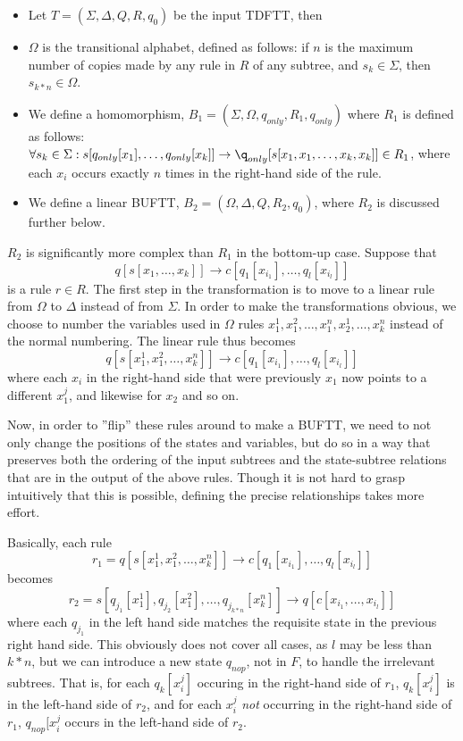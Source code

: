 \begin{itemize}
\item Let $T = (\Sigma, \Delta, Q, R, q_0)$ be the input TDFTT, then

\item $\Omega$ is the transitional alphabet, defined as follows: if $n$ is
the maximum number of copies made by any rule in $R$ of any subtree, and 
$s_k \in \Sigma$, then $s_{k*n} \in \Omega$.

\item We define a homomorphism, $B_1 = (\Sigma, \Omega, q_{only}, R_1, q_{only})$
where $R_1$ is defined as follows: $\forall s_k \in \Sigma:
s[q_{only}[x_1],\ldots,q_{only}[x_k]] \rightarrow
\q_{only}[s[x_1,x_1,\ldots,x_k,x_k]] \in R_1$, where each $x_i$ occurs
exactly $n$ times in the right-hand side of the rule.

\item We define a linear BUFTT, $B_2 = (\Omega, \Delta, Q, R_2, q_0)$,
	where $R_2$ is discussed further below.
\end{itemize}

$R_2$ is significantly more complex than $R_1$ in the bottom-up case. Suppose
that $$q[s[x_1,\ldots,x_k]] \rightarrow c[q_1[x_i_1],\ldots,q_l[x_i_l]]$$
is a rule $r \in R$. The first step in the transformation is to move to a
linear rule from $\Omega$ to $\Delta$ instead of from $\Sigma$.  In order
to make the transformations obvious, we choose to number the variables used
in $\Omega$ rules $x_1^1,x_1^2,\ldots,x_1^n,x_2^1,\ldots,x_k^n$ instead of
the normal numbering. The linear rule thus becomes
$$q[s[x_1^1,x_1^2,\ldots,x_k^n]] \rightarrow c[q_1[x_i_1],\ldots,q_l[x_i_l]]$$
where each $x_i$ in the right-hand side that were previously $x_1$ now
points to a different $x_1^j$, and likewise for $x_2$ and so on.

Now, in order to ''flip'' these rules around to make a BUFTT, we need to
not only change the positions of the states and variables, but do so in a
way that preserves both the ordering of the input subtrees and the
state-subtree relations that are in the output of the above rules. Though
it is not hard to grasp intuitively that this is possible, defining the
precise relationships takes more effort.

Basically, each rule
$$r_1 = q[s[x_1^1,x_1^2,\ldots,x_k^n]] \rightarrow c[q_1[x_i_1],\ldots,q_l[x_i_l]]$$
becomes
$$r_2 = s[q_j_1[x_1^1],q_j_2[x_1^2],\ldots,q_j_{k*n}[x_k^n]] \rightarrow q[c[x_i_1,\ldots,x_i_l]]$$
where each $q_j_1$ in the left hand side matches the requisite state in the
previous right hand side. This obviously does not cover all cases, as $l$
may be less than $k*n$, but we can introduce a new state $q_{nop}$, not in
$F$, to handle the irrelevant subtrees. That is, for each $q_k[x_i^j]$
occuring in the right-hand side of $r_1$, $q_k[x_i^j]$ is in the left-hand
side of $r_2$, and for each $x_i^j$ \emph{not} occurring in the right-hand
side of $r_1$, $q_{nop}[x_i^j$ occurs in the left-hand side of $r_2$. 

